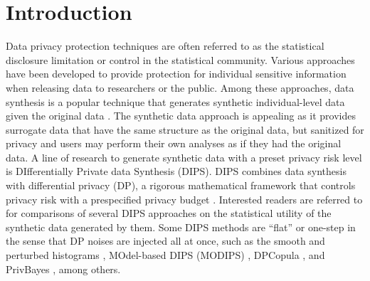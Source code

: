 \documentclass[12pt, A4]{article}
\theoremstyle{plain}
\theoremstyle{exampstyle}\newtheorem{defn}{Definition}
\theoremstyle{exampstyle}\newtheorem{lem}{Lemma}
\theoremstyle{exampstyle}\newtheorem{cor}{Corollary}
\theoremstyle{exampstyle}\newtheorem{pro}{Proposition}
\theoremstyle{exampstyle}\newtheorem{cla}{Claim}
\theoremstyle{exampstyle}\newtheorem{rem}{Remark}
\begin{document}
\newpage
{}
\section{Introduction}\label{sec:intro}

Data privacy protection techniques are often referred to as the statistical disclosure limitation or control in the statistical community. Various approaches have been developed to provide protection for individual sensitive information when releasing data to researchers or the public. Among these approaches, data synthesis is a popular technique that generates synthetic individual-level data given the original data \citep{rubin1993discussion, little1993statistical, liu2003,raghunathan2003multiple, reiter2003,  liu2004, reiter2009, drechsler2011book}. The synthetic data approach is appealing as it provides surrogate data that have the same structure as the original data, but sanitized for privacy and users may perform their own analyses as if they had the original data. A line of research to generate synthetic data with a preset privacy risk level is DIfferentially Private data Synthesis (DIPS). DIPS combines data synthesis with differential privacy (DP), a rigorous mathematical framework that controls privacy risk with a prespecified privacy budget  \citep{dwork2006calibrating}. Interested readers are referred to \citet{bowen2016differentially} for comparisons of several DIPS approaches on the statistical utility of the synthetic data generated by them. Some DIPS methods are ``flat'' or one-step in the sense that DP noises are injected all at once, such as the smooth and perturbed histograms \citep{wasserman2010statistical}, MOdel-based DIPS (MODIPS) \citep{liu2016model}, DPCopula \citep{DPcopula}, and PrivBayes \citep{privbayes},  among others.  
\end{document}
